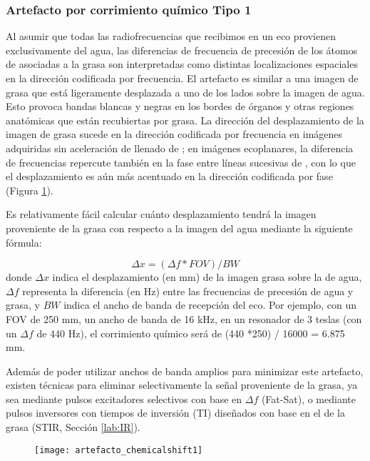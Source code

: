 \subsubsection{Artefacto por corrimiento químico Tipo 1}
Al asumir que todas las radiofrecuencias que recibimos en un eco provienen exclusivamente del agua, las diferencias de frecuencia de precesión de los átomos de  asociadas a la grasa son interpretadas como distintas localizaciones espaciales en la dirección codificada por frecuencia. El artefacto es similar a una imagen de grasa que está ligeramente desplazada a uno de los lados sobre la imagen de agua. Esto provoca bandas blancas y negras en los bordes de órganos y otras regiones anatómicas que están recubiertas por grasa. La dirección del desplazamiento de la imagen de grasa sucede en la dirección codificada por frecuencia en imágenes adquiridas sin aceleración de llenado de \espaciok; en imágenes ecoplanares, la diferencia de frecuencias repercute también en la fase entre líneas sucesivas de \espaciok, con lo que el desplazamiento es aún más acentuado en la dirección codificada por fase (Figura \ref{fig:artefacto_chemicalshift1}). 

Es relativamente fácil calcular cuánto desplazamiento tendrá la imagen proveniente de la grasa con respecto a la imagen del agua mediante la siguiente fórmula:

\begin{equation}
 \Delta x = (\Delta f * FOV)/ BW
\end{equation}
donde $\Delta x$ indica el desplazamiento (en mm) de la imagen grasa sobre la de agua, $\Delta f$ representa la diferencia (en Hz) entre las frecuencias de precesión de agua y grasa, y $BW$ indica el ancho de banda de recepción del eco. Por ejemplo, con un FOV de 250 mm, un ancho de banda de 16 kHz, en un resonador de 3 teslas (con un $\Delta f$ de 440 Hz), el corrimiento químico será de (440 *250) / 16000 = 6.875 mm.

Además de poder utilizar anchos de banda amplios para minimizar este artefacto, existen técnicas para eliminar selectivamente la señal proveniente de la grasa, ya sea mediante pulsos excitadores selectivos con base en $\Delta f$ (Fat-Sat), o mediante pulsos inversores con tiempos de inversión (TI) diseñados con base en el \Tone de la grasa (STIR, Sección \ref{lab:IR}).


\begin{figure}[htb]
 \begin{figg}
   \texttt{[image: artefacto\_chemicalshift1]}
   \caption{\figurapendiente}
 \label{fig:artefacto_chemicalshift1}
 \end{figg}
\end{figure}



